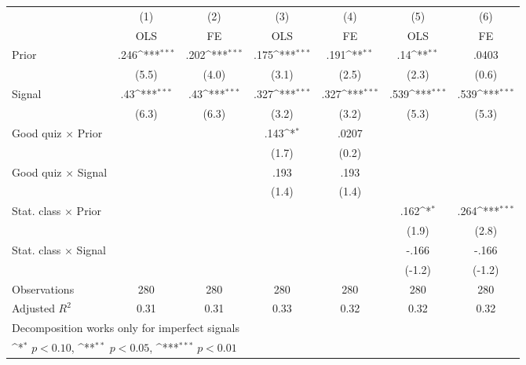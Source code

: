 {
\def\sym#1{\ifmmode^{#1}\else\(^{#1}\)\fi}
\begin{tabular}{l*{6}{c}}
\hline\hline
                &\multicolumn{1}{c}{(1)}&\multicolumn{1}{c}{(2)}&\multicolumn{1}{c}{(3)}&\multicolumn{1}{c}{(4)}&\multicolumn{1}{c}{(5)}&\multicolumn{1}{c}{(6)}\\
                &\multicolumn{1}{c}{OLS}&\multicolumn{1}{c}{FE}&\multicolumn{1}{c}{OLS}&\multicolumn{1}{c}{FE}&\multicolumn{1}{c}{OLS}&\multicolumn{1}{c}{FE}\\
\hline
Prior           &     .246\sym{***}&     .202\sym{***}&     .175\sym{***}&     .191\sym{**} &      .14\sym{**} &    .0403         \\
                &    (5.5)         &    (4.0)         &    (3.1)         &    (2.5)         &    (2.3)         &    (0.6)         \\
Signal          &      .43\sym{***}&      .43\sym{***}&     .327\sym{***}&     .327\sym{***}&     .539\sym{***}&     .539\sym{***}\\
                &    (6.3)         &    (6.3)         &    (3.2)         &    (3.2)         &    (5.3)         &    (5.3)         \\
Good quiz $\times$ Prior&                  &                  &     .143\sym{*}  &    .0207         &                  &                  \\
                &                  &                  &    (1.7)         &    (0.2)         &                  &                  \\
Good quiz $\times$ Signal&                  &                  &     .193         &     .193         &                  &                  \\
                &                  &                  &    (1.4)         &    (1.4)         &                  &                  \\
Stat. class $\times$ Prior&                  &                  &                  &                  &     .162\sym{*}  &     .264\sym{***}\\
                &                  &                  &                  &                  &    (1.9)         &    (2.8)         \\
Stat. class $\times$ Signal&                  &                  &                  &                  &    -.166         &    -.166         \\
                &                  &                  &                  &                  &   (-1.2)         &   (-1.2)         \\
\hline
Observations    &      280         &      280         &      280         &      280         &      280         &      280         \\
Adjusted \(R^{2}\)&     0.31         &     0.31         &     0.33         &     0.32         &     0.32         &     0.32         \\
\hline\hline
\multicolumn{7}{l}{\footnotesize Decomposition works only for imperfect signals}\\
\multicolumn{7}{l}{\footnotesize \sym{*} \(p<0.10\), \sym{**} \(p<0.05\), \sym{***} \(p<0.01\)}\\
\end{tabular}
}
